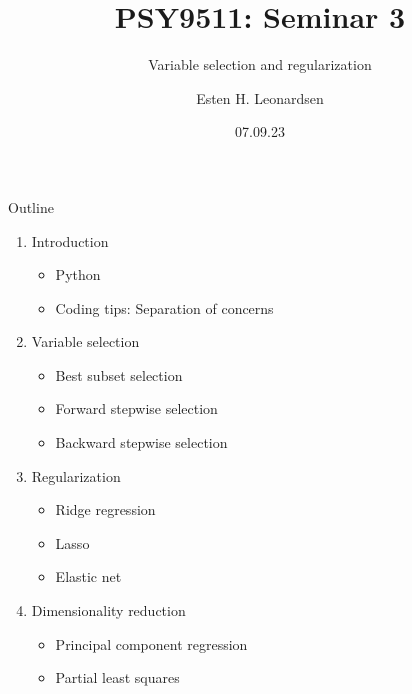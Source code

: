 \documentclass[8pt]{beamer}
\title{PSY9511: Seminar 3}
\subtitle{Variable selection and regularization}
\author{Esten H. Leonardsen}
\date{07.09.23}
\begin{document}
	\begin{frame}
	 	\maketitle
	\end{frame}

    \begin{frame}{Outline}
        \centering
        \vfill
        \begin{enumerate}
            \item Introduction
            \begin{itemize}
                \item Python
                \item Coding tips: Separation of concerns
            \end{itemize}
            \item Variable selection
            \begin{itemize}
                \item Best subset selection
                \item Forward stepwise selection
                \item Backward stepwise selection
            \end{itemize}
            \item Regularization
            \begin{itemize}
                \item Ridge regression
                \item Lasso
                \item Elastic net
            \end{itemize}
            \item Dimensionality reduction
            \begin{itemize}
                \item Principal component regression
                \item Partial least squares
            \end{itemize}
        \end{enumerate}
        \vfill
    \end{frame}

    \def\codewidth{4.5cm}
\end{document}
